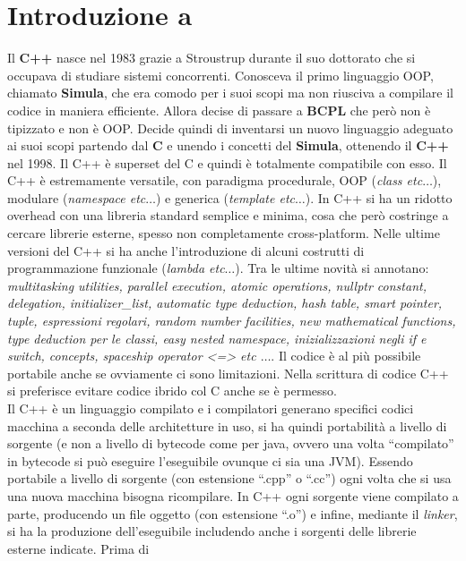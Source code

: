 \documentclass[a4paper,12pt, oneside]{book}
\begin{document}
\chapter{Introduzione a \cpp}
Il \textbf{C++} nasce nel 1983 grazie a Stroustrup durante il suo dottorato
che si occupava di studiare sistemi concorrenti. Conosceva il primo
linguaggio OOP, chiamato \textbf{Simula}, che era comodo per i suoi
scopi ma non riusciva a compilare il codice in maniera
efficiente. Allora decise di passare a \textbf{BCPL} che però non è
tipizzato e non è OOP. Decide quindi di inventarsi un nuovo linguaggio
adeguato ai suoi scopi partendo dal \textbf{C} e unendo i concetti del
\textbf{Simula}, ottenendo il \textbf{C++} nel 1998. Il C++ è
superset del C e quindi è totalmente compatibile con esso. Il C++ è
estremamente versatile, con paradigma procedurale, OOP (\textit{class
  etc$\ldots$}), modulare (\textit{namespace etc$\ldots$}) e generica
(\textit{template etc$\ldots$}). In C++ si ha un ridotto overhead con
una libreria standard semplice e minima, cosa che però costringe a
cercare librerie esterne, spesso non completamente
cross-platform. Nelle ultime versioni del C++ si ha anche
l'introduzione di alcuni costrutti di programmazione funzionale
(\textit{lambda etc$\ldots$}). Tra le ultime novità si annotano:
\textit{multitasking utilities, parallel execution, atomic
  operations, nullptr constant, delegation, initializer\_list,
  automatic type deduction, hash table, smart pointer, tuple,
  espressioni regolari, random number facilities, new mathematical
  functions, type deduction per le classi, easy nested namespace,
  inizializzazioni negli if e switch, concepts, spaceship operator <=>
  etc $\ldots$}. Il codice è al più possibile portabile anche se
ovviamente ci sono limitazioni. Nella scrittura di codice C++ si
preferisce evitare codice ibrido col C anche se è permesso.\\
Il C++ è un linguaggio compilato e i compilatori generano specifici
codici macchina a seconda delle architetture in uso, si ha quindi
portabilità a livello di sorgente (e non a livello di bytecode come
per java, ovvero una volta ``compilato'' in bytecode si può eseguire
l'eseguibile ovunque ci sia una JVM). Essendo portabile a livello di
sorgente (con estensione ``.cpp'' o ``.cc'') ogni volta che si usa una
nuova macchina bisogna ricompilare. In C++ ogni sorgente viene
compilato a parte, producendo un file oggetto (con estensione ``.o'') e infine,
mediante il \textit{linker}, si ha la produzione dell'eseguibile
includendo anche i sorgenti delle librerie esterne indicate. Prima di
\end{document}
